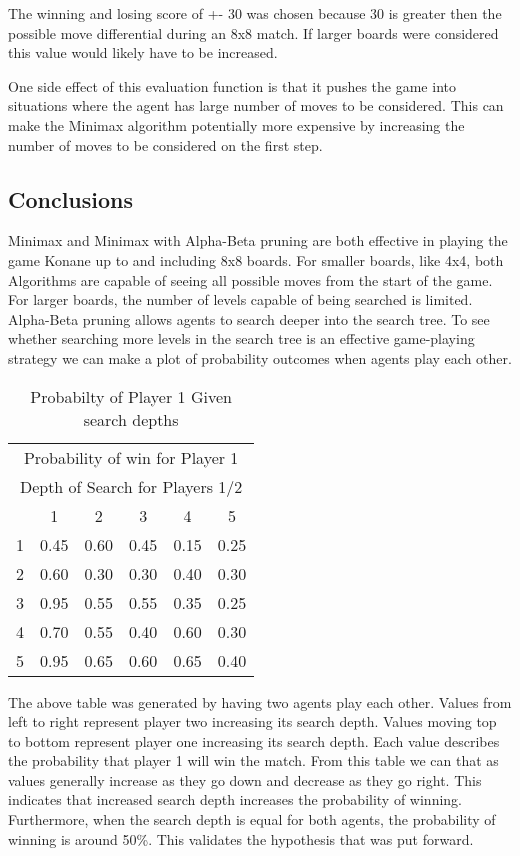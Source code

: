\documentclass[12pt,letterpaper]{article}
\begin{document}
The winning and losing score of +- 30 was chosen because 30 is greater then the possible move differential during an 8x8 match. If larger boards were considered this value would likely have to be increased. 

One side effect of this evaluation function is that it pushes the game into situations where the agent has large number of moves to be considered. This can make the Minimax algorithm potentially more expensive by increasing the number of moves to be considered on the first step. 
\subsection{Conclusions}

Minimax and Minimax with Alpha-Beta pruning are both effective in playing the game Konane up to and including 8x8 boards. For smaller boards, like 4x4, both Algorithms are capable of seeing all possible moves from the start of the game. For larger boards, the number of levels capable of being searched is limited. 
Alpha-Beta pruning allows agents to search deeper into the search tree. To see whether searching more levels in the search tree is an effective game-playing strategy we can make a plot of probability outcomes when agents play each other. 


\begin{table}[h]
\centering

\begin{tabular}{c|c|c|c|c|c|}
\multicolumn{6}{c}{Probability of win for Player 1}  \\ 
\multicolumn{6}{c}{Depth of Search for Players 1/2}\\
 & 1 & 2 & 3 & 4 & 5 \\
\hline
1 &  0.45 &  0.60 &  0.45 &  0.15 &  0.25 \\
\hline
2 &  0.60 &  0.30 &  0.30 &  0.40 &  0.30 \\
\hline
3 &  0.95 &  0.55 &  0.55 &  0.35 &  0.25 \\
\hline
4 &  0.70 &  0.55 &  0.40 &  0.60 &  0.30 \\
\hline
5 &  0.95 &  0.65 &  0.60 &  0.65 &  0.40 \\
\hline
\end{tabular}
\caption{Probabilty of Player 1 Given search depths}
\end{table}

The above table was generated by having two agents play each other. Values from left to right represent player two increasing its search depth. Values moving top to bottom represent player one increasing its search depth. Each value describes the probability that player 1 will win the match. From this table we can that as values generally increase as they go down and decrease as they go right. This indicates that increased search depth increases the probability of winning. Furthermore, when the search depth is equal for both agents, the probability of winning is around 50\%. This validates the hypothesis that was put forward. 
\end{document}
